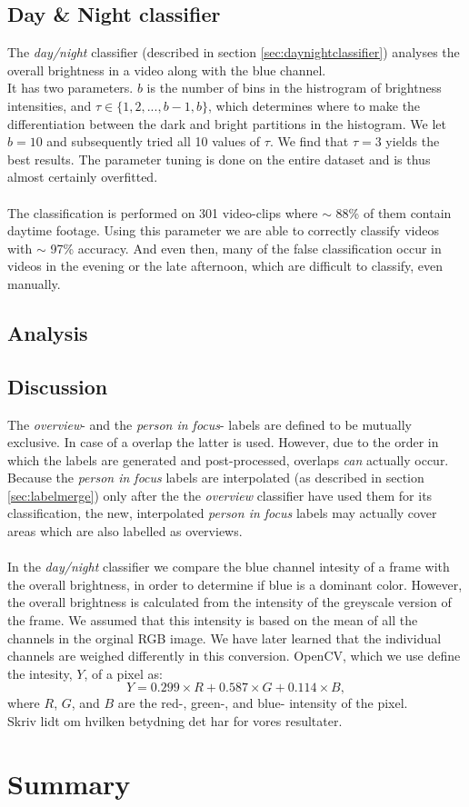 \subsection{Day \& Night classifier}
%
The \textit{day/night} classifier (described in section \ref{sec:daynightclassifier}) analyses the overall brightness in a video along with the blue channel.\\
It has two parameters. $b$ is the number of bins in the histrogram of brightness intensities, and $\tau \in \{1,2,...,b-1,b\}$, which determines where to make the differentiation between the dark and bright partitions in the histogram. We let $b = 10$ and subsequently tried all 10 values of $\tau$. We find that $\tau = 3$ yields the best results. The parameter tuning is done on the entire dataset and is thus almost certainly overfitted.\\
\\
The classification is performed on 301 video-clips where $\sim$ 88\% of them contain daytime footage. Using this parameter we are able to correctly classify videos with $\sim$ 97\% accuracy. And even then, many of the false classification occur in videos in the evening or the late afternoon, which are difficult to classify, even manually.
%
\subsection{Analysis}
%
\subsection{Discussion}\label{sec:phase2discussion}
%
The \textit{overview}- and the \textit{person in focus}- labels are defined to be mutually exclusive. In case of a overlap the latter is used. However, due to the order in which the labels are generated and post-processed, overlaps \textit{can} actually occur. Because the \textit{person in focus} labels are interpolated (as described in section \ref{sec:labelmerge}) only after the the \textit{overview} classifier have used them for its classification, the new, interpolated \textit{person in focus} labels may actually cover areas which are also labelled as overviews.\\
\\
In the \textit{day/night} classifier we compare the blue channel intesity of a frame with the overall brightness, in order to determine if blue is a dominant color. However, the overall brightness is calculated from the intensity of the greyscale version of the frame. We assumed that this intensity is based on the mean of all the channels in the orginal RGB image. We have later learned that the individual channels are weighed differently in this conversion. OpenCV, which we use define the intesity, $Y$, of a pixel as:
%
\[
Y = 0.299 \times R + 0.587 \times  G + 0.114 \times B,
\]
%
where $R$, $G$, and $B$ are the red-, green-, and blue- intensity of the pixel.\\
Skriv lidt om hvilken betydning det har for vores resultater.
\section{Summary}
%